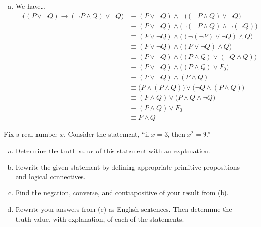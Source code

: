 \documentclass[11pt,letterpaper]{article}
\begin{document}
\begin{enumerate}[(a)]
\item We have\dots
	\[
	\begin{aligned}
	\neg \big( (P \vee \neg Q) \to (\neg P \wedge Q) \vee \neg Q \big)&\equiv (P \vee \neg Q) \wedge \neg \big( (\neg P \wedge Q) \vee \neg Q \big) \\[0.3cm]
	&\equiv (P \vee \neg Q) \wedge \big( \neg (\neg P \wedge Q) \wedge \neg (\neg Q) \big) \\[0.3cm]
	&\equiv (P \vee \neg Q) \wedge \big( (\neg(\neg P) \vee \neg Q) \wedge Q \big) \\[0.3cm]
	&\equiv (P \vee \neg Q) \wedge \big( ( P \vee \neg Q) \wedge Q \big) \\[0.3cm]
	&\equiv (P \vee \neg Q) \wedge \big( (P \wedge Q) \vee (\neg Q \wedge Q) \big) \\[0.3cm]	
	&\equiv (P \vee \neg Q) \wedge \big( (P \wedge Q) \vee F_0 \big) \\[0.3cm]	
	&\equiv (P \vee \neg Q) \wedge (P \wedge Q) \\[0.3cm]	
	&\equiv \big( P \wedge (P \wedge Q) \big) \vee \big( \neg Q \wedge (P \wedge Q) \big) \\[0.3cm]	
	&\equiv (P \wedge Q) \vee \big( P \wedge Q \wedge \neg Q \big) \\[0.3cm]	
	&\equiv (P \wedge Q) \vee F_0 \\[0.3cm]
	&\equiv P \wedge Q	
	\end{aligned}
	\]
\end{enumerate}



\newpage



 Fix a real number $x$. Consider the statement, ``if $x= 3$, then $x^2= 9$.''
	\begin{enumerate}[(a)]
	\item Determine the truth value of this statement with an explanation. 
	\item Rewrite the given statement by defining appropriate primitive propositions and logical connectives. 
	\item Find the negation, converse, and contrapositive of your result from (b).
	\item Rewrite your answers from (c) as English sentences. Then determine the truth value, with explanation, of each of the statements. 
	\end{enumerate} \pspace
\end{document}
